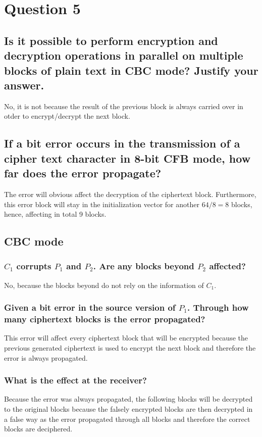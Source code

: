 \documentclass{report}
\begin{document}
	\section{Question 5}
	\startsection
		\renewcommand{\thesubsection}{\thesection.\Alph{subsection}}
		\subsection{Is it possible to perform encryption and decryption operations in parallel on multiple blocks of plain text in CBC mode? Justify your answer.}
		\startsubsection
			No, it is not because the result of the previous block is always carried over in otder to encrypt/decrypt the next block.
		\closesection
		\subsection{If a bit error occurs in the transmission of a cipher text character in 8-bit CFB mode, how far does the error propagate?}
		\startsubsection
			The error will obvious affect the decryption of the ciphertext block. Furthermore, this error block will stay in the initialization vector for another $64/8 = 8$ blocks, hence, affecting in total 9 blocks.
		\closesection
		\subsection{CBC mode}
		\startsubsection
			\subsubsection{$C_1$ corrupts $P_1$ and $P_2$. Are any blocks beyond $P_2$ affected?}
			\startsubsection
				No, because the blocks beyond do not rely on the information of  $C_1$.
			\closesection
			\subsubsection{Given a bit error in the source version of $P_1$. Through how many ciphertext blocks is the error propagated?}
			\startsubsection
				This error will affect every ciphertext block that will be encrypted because the previous generated ciphertext is used to encrypt the next block and therefore the error is always propagated.
			\closesection
			\subsubsection{What is the effect at the receiver?}
			\startsubsection
				Because the error was always propagated, the following blocks will be decrypted to the original blocks because the falsely encrypted blocks are then decrypted in a false way as the error propagated through all blocks and therefore the correct blocks are deciphered.
			\closesection
		\closesection
	\closesection
\end{document}
